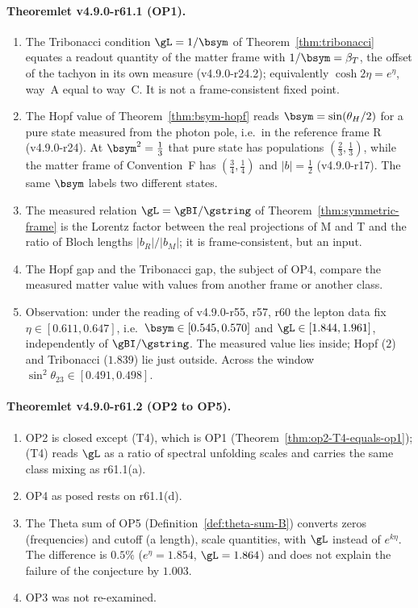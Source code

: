 \paragraph{Theoremlet v4.9.0-r61.1 (OP1).}
\begin{enumerate}[leftmargin=2em]
\item[(a)] The Tribonacci condition \(\gL=1/\bsym\) of Theorem~\ref{thm:tribonacci} equates a readout quantity of the matter frame with \(1/\bsym=\beta_T\), the offset
of the tachyon in its own measure (v4.9.0-r24.2); equivalently \(\cosh2\eta=e^\eta\), way~A equal to way~C.  It is not a frame-consistent fixed point.
\item[(b)] The Hopf value of Theorem~\ref{thm:bsym-hopf} reads \(\bsym=\sin(\theta_H/2)\) for a pure state measured from the photon pole, i.e.\ in the reference frame R
(v4.9.0-r24).  At \(\bsym^2=\tfrac13\) that pure state has populations \((\tfrac23,\tfrac13)\), while the matter frame of Convention~F has \((\tfrac34,\tfrac14)\) and \(|b|=\tfrac12\)
(v4.9.0-r17).  The same \(\bsym\) labels two different states.
\item[(c)] The measured relation \(\gL=\gBI/\gstring\) of Theorem~\ref{thm:symmetric-frame} is the Lorentz factor between the real projections of M and T and the ratio of
Bloch lengths \(|b_R|/|b_M|\); it is frame-consistent, but an input.
\item[(d)] The Hopf gap and the Tribonacci gap, the subject of OP4, compare the measured matter value with values from another frame or another class.
\item[(e)] Observation: under the reading of v4.9.0-r55, r57, r60 the lepton data fix \(\eta\in[0.611,0.647]\), i.e.\ \(\bsym\in[0.545,0.570]\) and \(\gL\in[1.844,1.961]\),
independently of \(\gBI/\gstring\).  The measured value lies inside; Hopf (\(2\)) and Tribonacci (\(1.839\)) lie just outside.  Across the window
\(\sin^2\theta_{23}\in[0.491,0.498]\).
\end{enumerate}

\paragraph{Theoremlet v4.9.0-r61.2 (OP2 to OP5).}
\begin{enumerate}[leftmargin=2em]
\item[(a)] OP2 is closed except (T4), which is OP1 (Theorem~\ref{thm:op2-T4-equals-op1}); (T4) reads \(\gL\) as a ratio of spectral unfolding scales and carries the same
class mixing as r61.1(a).
\item[(b)] OP4 as posed rests on r61.1(d).
\item[(c)] The Theta sum of OP5 (Definition~\ref{def:theta-sum-B}) converts zeros (frequencies) and cutoff (a length), scale quantities, with \(\gL\) instead of \(e^{k\eta}\).
The difference is \(0.5\%\) (\(e^\eta=1.854\), \(\gL=1.864\)) and does not explain the failure of the conjecture by \(1.003\).
\item[(d)] OP3 was not re-examined.
\end{enumerate}

